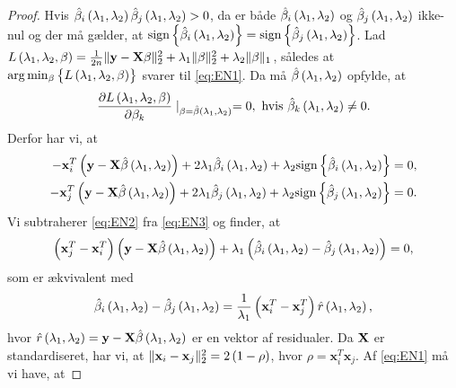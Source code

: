 \begin{proof}
Hvis \(\hat{\beta}_i \del{\lambda_1, \lambda_2} \hat{\beta}_j \del{\lambda_1, \lambda_2} > 0\), da er både \(\hat{\beta}_i \del{\lambda_1, \lambda_2}\) og \(\hat{\beta}_j \del{\lambda_1, \lambda_2}\) ikke-nul og der må gælder, at \(\text{sign} \cbr{\hat{\beta}_i \del{\lambda_1, \lambda_2}} = \text{sign} \cbr{\hat{\beta}_j \del{\lambda_1, \lambda_2}}\).
Lad \(L \del{\lambda_1,\lambda_2, \beta} = \frac{1}{2n} \Vert \y - \X \beta \Vert_2^2 + \lambda_1 \Vert \beta \Vert_2^2 + \lambda_2 \Vert \beta \Vert_1\), således at  \(\arg \min_{\beta} \cbr{L \del{\lambda_1,\lambda_2, \beta}}\) svarer til \eqref{eq:EN1}.
Da må \(\hat{\beta} \del{\lambda_1, \lambda_2}\) opfylde, at
\begin{align*}
\frac{\partial L \del{\lambda_1,\lambda_2, \beta} }{\partial \beta_k} \mid_{\beta = \hat{\beta} \del{\lambda_1, \lambda_2}}=0, \text{ hvis } \hat{\beta}_k \del{\lambda_1, \lambda_2} \neq 0.
\end{align*}
Derfor har vi, at
\begin{align}
-\mathbf{x}_i^T \del{\y - \X \hat{\beta} \del{\lambda_1, \lambda_2}} + 2 \lambda_1 \hat{\beta}_i \del{\lambda_1, \lambda_2} + \lambda_2 \text{sign} \cbr{\hat{\beta}_i \del{\lambda_1, \lambda_2}} &= 0, \label{eq:EN2}\\
-\mathbf{x}_j^T \del{\y - \X \hat{\beta} \del{\lambda_1, \lambda_2}} + 2 \lambda_1 \hat{\beta}_j \del{\lambda_1, \lambda_2} + \lambda_2 \text{sign} \cbr{\hat{\beta}_j \del{\lambda_1, \lambda_2}} &= 0. \label{eq:EN3}
\end{align}
Vi subtraherer \eqref{eq:EN2} fra \eqref{eq:EN3} og finder, at
\begin{align*}
\del{\mathbf{x}_j^T-\mathbf{x}_i^T} \del{\y - \X \hat{\beta} \del{\lambda_1, \lambda_2}} + \lambda_1 \del{\hat{\beta}_i \del{\lambda_1, \lambda_2} - \hat{\beta}_j \del{\lambda_1, \lambda_2}} =0,
\end{align*}
som er ækvivalent med
\begin{align}
\hat{\beta}_i \del{\lambda_1, \lambda_2} - \hat{\beta}_j \del{\lambda_1, \lambda_2} = \frac{1}{\lambda_1} \del{\mathbf{x}_i^T-\mathbf{x}_j^T} \hat{r}\del{\lambda_1, \lambda_2}, \label{eq:EN4}
\end{align}
hvor \(\hat{r}\del{\lambda_1, \lambda_2} = \y - \X  \hat{\beta} \del{\lambda_1, \lambda_2}\) er en vektor af residualer.
Da \(\mathbf{X}\) er standardiseret, har vi, at \(\Vert \mathbf{x}_i - \mathbf{x}_j \Vert_2^2=2 \del{1-\rho}\), hvor \(\rho = \mathbf{x}_i^T \mathbf{x}_j\).
Af \eqref{eq:EN1} må vi have, at

\end{proof}
